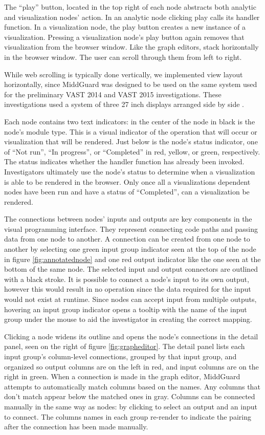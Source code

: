\documentclass[midd]{thesis}
\begin{document}
The ``play'' button, located in the top right of each node abstracts both
analytic and visualization nodes' action. In an analytic node clicking play
calls its handler function. In a visualization node, the play button creates a
new instance of a visualization. Pressing a visualization node's play button
again removes that visualization from the browser window. Like the graph
editors, stack horizontally in the browser window. The user can scroll through
them from left to right.

While web scrolling is typically done vertically, we implemented view layout
horizontally, since MiddGuard was designed to be used on the same system used
for the preliminary VAST 2014 and VAST 2015 investigations. These investigations
used a system of three 27 inch displays arranged side by side
\cite{middguard-dinofunworld}.

Each node contains two text indicators: in the center of the node in black is
the node's module type. This is a visual indicator of the operation that will
occur or visualization that will be rendered. Just below is the node's status
indicator, one of ``Not run'', ``In progress'', or ``Completed'' in red, yellow,
or green, respectively. The status indicates whether the handler function has
already been invoked. Investigators ultimately use the node's status to
determine when a visualization is able to be rendered in the browser. Only once
all a visualizations dependent nodes have been run and have a status of
``Completed'', can a visualization be rendered.

The connections between nodes' inputs and outputs are key components in the
visual programming interface. They represent connecting code paths and passing
data from one node to another. A connection can be created from one node to
another by selecting one green input group indicator seen at the top of the node
in figure \ref{fig:annotatednode} and one red output indicator like the one seen
at the bottom of the same node. The selected input and output connectors are
outlined with a black stroke. It is possible to connect a node's input to its
own output, however this would result in no operation since the data required
for the input would not exist at runtime. Since nodes can accept input from
multiple outputs, hovering an input group indicator opens a tooltip with the
name of the input group under the mouse to aid the investigator in creating the
correct mapping.

Clicking a node widens its outline and opens the node's connections in the
detail panel, seen on the right of figure \ref{fig:grapheditor}. The detail
panel lists each input group's column-level connections, grouped by that input
group, and organized so output columns are on the left in red, and input columns
are on the right in green. When a connection is made in the graph editor,
MiddGuard attempts to automatically match columns based on the names. Any
columns that don't match appear below the matched ones in gray. Columns can be
connected manually in the same way as nodes: by clicking to select an output and
an input to connect. The columns names in each group re-render to indicate the
pairing after the connection has been made manually.
\end{document}
